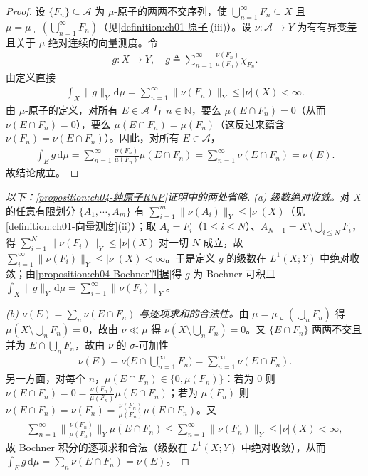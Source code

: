 \documentclass[../../main.tex]{subfiles}%
\begin{document}
\begin{proof}
设 $\{F_n\}\subseteq\mathcal{A}$ 为 $\mu$-原子的两两不交序列，使 $\bigcup_{n=1}^\infty F_n\subseteq X$ 且 $\mu=\mu\llcorner(\bigcup_{n=1}^\infty F_n)$（见\cref{definition:ch01-原子}(iii)）。设 $\nu:\mathcal{A}\to Y$ 为有有界变差且关于 $\mu$ 绝对连续的向量测度。令
\begin{align*}
g:X\to Y,\quad g\triangleq \sum_{n=1}^\infty\frac{\nu(F_n)}{\mu(F_n)}\chi_{F_n}.
\end{align*}
由定义直接
\begin{align*}
\int_X\|g\|_Y\,\mathrm{d}\mu=\sum_{n=1}^\infty\|\nu(F_n)\|_Y\leqslant|\nu|(X)<\infty.
\end{align*}
由 $\mu$-原子的定义，对所有 $E\in\mathcal{A}$ 与 $n\in\mathbb{N}$，要么 $\mu(E\cap F_n)=0$（从而 $\nu(E\cap F_n)=0$），要么 $\mu(E\cap F_n)=\mu(F_n)$（这反过来蕴含 $\nu(F_n)=\nu(E\cap F_n)$）。因此，对所有 $E\in\mathcal{A}$，
\begin{align*}
\int_E g\,\mathrm{d}\mu=\sum_{n=1}^\infty\frac{\nu(F_n)}{\mu(F_n)}\mu(E\cap F_n)=\sum_{n=1}^\infty\nu(E\cap F_n)=\nu(E).
\end{align*}
故结论成立。
\end{proof}

\begin{proof}[以下：\cref{proposition:ch04-纯原子RNP}证明中的两处省略]
\emph{(a) 级数绝对收敛。}对 $X$ 的任意有限划分 $\{A_1,\cdots,A_m\}$ 有 $\sum_{i=1}^m\|\nu(A_i)\|_Y\leqslant|\nu|(X)$（见\cref{definition:ch01-向量测度}(ii)）；取 $A_i=F_i$（$1\leqslant i\leqslant N$）、$A_{N+1}=X\setminus\bigcup_{i\leqslant N}F_i$，得 $\sum_{i=1}^N\|\nu(F_i)\|_Y\leqslant|\nu|(X)$ 对一切 $N$ 成立，故 $\sum_{i=1}^\infty\|\nu(F_i)\|_Y\leqslant|\nu|(X)<\infty$。于是定义 $g$ 的级数在 $L^1(X;Y)$ 中绝对收敛；由\cref{proposition:ch04-Bochner判据}得 $g$ 为 Bochner 可积且 $\int_X\|g\|_Y\,\mathrm{d}\mu=\sum_{i=1}^\infty\|\nu(F_i)\|_Y$。

\emph{(b) $\nu(E)=\sum_n\nu(E\cap F_n)$ 与逐项求和的合法性。}由 $\mu=\mu\llcorner(\bigcup_nF_n)$ 得 $\mu(X\setminus\bigcup_nF_n)=0$，故由 $\nu\ll\mu$ 得 $\nu(X\setminus\bigcup_nF_n)=0$。又 $\{E\cap F_n\}$ 两两不交且并为 $E\cap\bigcup_nF_n$，故由 $\nu$ 的 $\sigma$-可加性
\begin{align*}
\nu(E)=\nu\Big(E\cap\bigcup_{n=1}^\infty F_n\Big)=\sum_{n=1}^\infty\nu(E\cap F_n).
\end{align*}
另一方面，对每个 $n$，$\mu(E\cap F_n)\in\{0,\mu(F_n)\}$：若为 $0$ 则 $\nu(E\cap F_n)=0=\frac{\nu(F_n)}{\mu(F_n)}\mu(E\cap F_n)$；若为 $\mu(F_n)$ 则 $\nu(E\cap F_n)=\nu(F_n)=\frac{\nu(F_n)}{\mu(F_n)}\mu(E\cap F_n)$。又
\begin{align*}
\sum_{n=1}^\infty\Big\|\frac{\nu(F_n)}{\mu(F_n)}\Big\|_Y\mu(E\cap F_n)\leqslant\sum_{n=1}^\infty\|\nu(F_n)\|_Y\leqslant|\nu|(X)<\infty,
\end{align*}
故 Bochner 积分的逐项求和合法（级数在 $L^1(X;Y)$ 中绝对收敛），从而 $\int_Eg\,\mathrm{d}\mu=\sum_n\nu(E\cap F_n)=\nu(E)$。
\end{proof}
\end{document}

